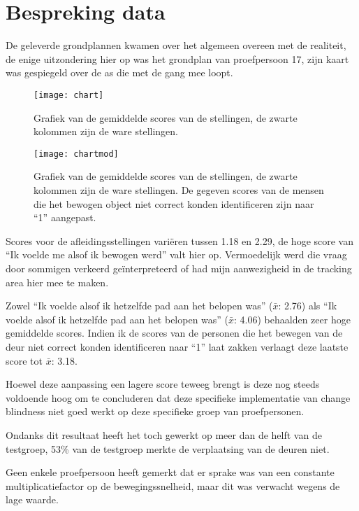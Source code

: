\section{Bespreking data}
De geleverde grondplannen kwamen over het algemeen overeen met de realiteit, de
enige uitzondering hier op was het grondplan van proefpersoon 17, zijn kaart was
gespiegeld over de as die met de gang mee loopt.

\begin{figure}[h!]
    \centering
    \texttt{[image: chart]}
    \caption{Grafiek van de gemiddelde scores van de stellingen, de zwarte 
    kolommen zijn de ware stellingen.}
    \label{fig:chart}
\end{figure}

\begin{figure}[h!]
    \centering
    \texttt{[image: chartmod]}
    \caption{Grafiek van de gemiddelde scores van de stellingen, de zwarte 
    kolommen zijn de ware stellingen. De gegeven scores van de mensen die het
    bewogen object niet correct konden identificeren zijn naar ``1'' aangepast.}
    \label{fig:chartmod}
\end{figure}

Scores voor de afleidingsstellingen vari\"eren tussen 1.18 en 2.29, de hoge score
van ``Ik voelde me alsof ik bewogen werd'' valt hier op. Vermoedelijk werd die
vraag door sommigen verkeerd ge\"interpreteerd of had mijn aanwezigheid in de
tracking area hier mee te maken.

Zowel ``Ik voelde alsof ik hetzelfde pad aan het belopen was'' ($\bar{x}$: 2.76)
als ``Ik voelde alsof ik hetzelfde pad aan het belopen was'' ($\bar{x}$: 4.06)
behaalden zeer hoge gemiddelde scores. Indien ik de scores van de personen die
het bewegen van de deur niet correct konden identificeren naar ``1'' laat zakken
verlaagt deze laatste score tot $\bar{x}$: 3.18.

Hoewel deze aanpassing een lagere score teweeg brengt is deze nog steeds
voldoende hoog om te concluderen dat deze specifieke implementatie van
change blindness niet goed werkt op deze specifieke groep van proefpersonen.

Ondanks dit resultaat heeft het toch gewerkt op meer dan de helft van de
testgroep, 53\% van de testgroep merkte de verplaatsing van de deuren niet.

Geen enkele proefpersoon heeft gemerkt dat er sprake was van een constante
multiplicatiefactor op de bewegingssnelheid, maar dit was verwacht wegens de lage
waarde\cite{steinicke09}.


